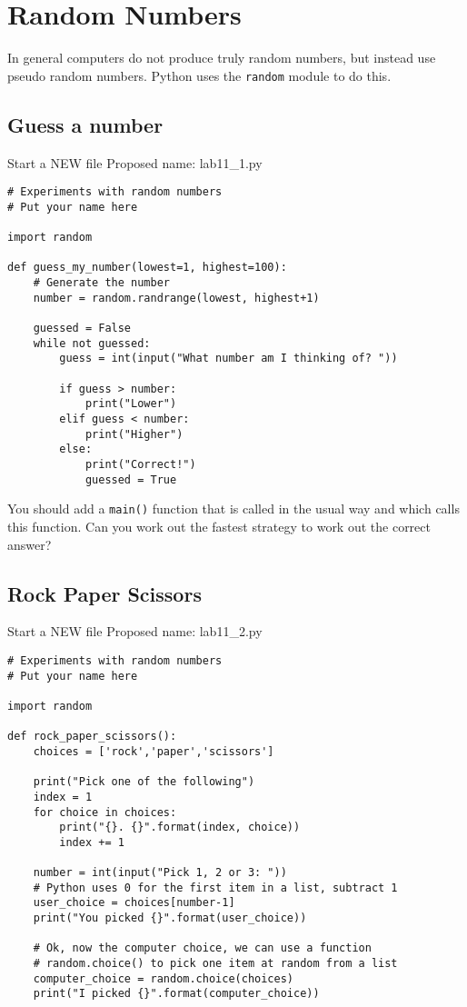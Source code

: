 \documentclass[12pt,oneside]{cttutorial}
\begin{document}
\section{Random Numbers}

In general computers do not produce truly random numbers, but instead use pseudo random numbers. Python uses the \lstinline!random! module to do this.

\subsection{Guess a number}

\alert{Start a NEW file}
Proposed name: lab11\_1.py
\begin{lstlisting}
# Experiments with random numbers
# Put your name here

import random

def guess_my_number(lowest=1, highest=100):
    # Generate the number
    number = random.randrange(lowest, highest+1)

    guessed = False
    while not guessed:
        guess = int(input("What number am I thinking of? "))

        if guess > number:
            print("Lower")
        elif guess < number:
            print("Higher")
        else:
            print("Correct!")
            guessed = True

\end{lstlisting}

You should add a \lstinline!main()! function that is called in the usual way and which calls this function. Can you work out the fastest strategy to work out the correct answer?

\subsection{Rock Paper Scissors}

\alert{Start a NEW file}
Proposed name: lab11\_2.py
\begin{lstlisting}
# Experiments with random numbers
# Put your name here

import random

def rock_paper_scissors():
    choices = ['rock','paper','scissors']

    print("Pick one of the following")
    index = 1
    for choice in choices:
        print("{}. {}".format(index, choice))
        index += 1

    number = int(input("Pick 1, 2 or 3: "))
    # Python uses 0 for the first item in a list, subtract 1
    user_choice = choices[number-1]
    print("You picked {}".format(user_choice))

    # Ok, now the computer choice, we can use a function
    # random.choice() to pick one item at random from a list
    computer_choice = random.choice(choices)
    print("I picked {}".format(computer_choice))
         
\end{lstlisting}
\end{document}
